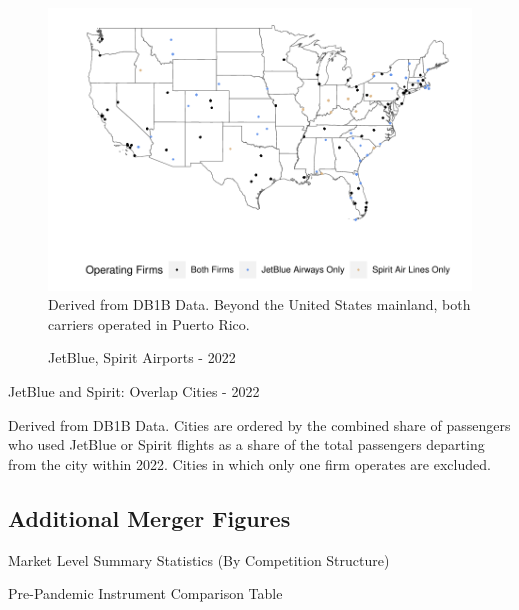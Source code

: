 \documentclass{article}
\begin{document}
\begin{appendices}
\begin{figure}
	\caption{JetBlue, Spirit Airports - 2022}
	\label{fig:JBSpirit_Airports_2022}
	\includegraphics[width = \linewidth]{Map_Mainland_Both_2022.pdf}
	\footnotesize{Derived from DB1B Data. Beyond the United States mainland, both carriers operated in Puerto Rico.}
\end{figure}


	\begin{table}
		\caption{JetBlue and Spirit: Overlap Cities - 2022}
		\label{tab:KeyCities}
		
		\footnotesize{Derived from DB1B Data. Cities are ordered by the combined share of passengers who used JetBlue or Spirit flights as a share of the total passengers departing from the city within 2022. Cities in which only one firm operates are excluded.}
	\end{table}

	
	\FloatBarrier
	
\FloatBarrier
    \subsection{Additional Merger Figures}
    \begin{table}
        \caption{Market Level Summary Statistics (By Competition Structure)}
        \label{fig:Market_Type_Summary}
                  \vspace{-15mm}
        \begin{center}
        
        \end{center}
    \end{table}
    
    \begin{table}
        \caption{Pre-Pandemic Instrument Comparison Table}
        \label{tab:Instrument_Compare_Pre}
        \resizebox{\linewidth}{!}{%

}
\end{table}
\end{appendices}
\end{document}
